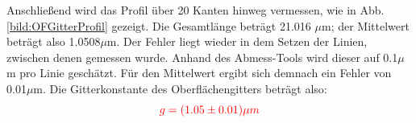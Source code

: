 \clearpage

Anschließend wird das Profil über 20 Kanten hinweg vermessen, wie in Abb. \ref{bild:OFGitterProfil} gezeigt. Die Gesamtlänge beträgt 
21.016 $\mu$m; der Mittelwert beträgt also 1.0508$\mu$m. 
Der Fehler liegt wieder in dem Setzen der Linien, zwischen denen gemessen wurde. Anhand des Abmess-Tools wird dieser auf 0.1$\mu$m pro 
Linie geschätzt. Für den Mittelwert ergibt sich demnach ein Fehler von 0.01$\mu$m. Die Gitterkonstante des Oberflächengitters beträgt also:
\begin{equation*}
    \textcolor{red}{g = (1.05 \pm 0.01) \mu m}
\end{equation*}